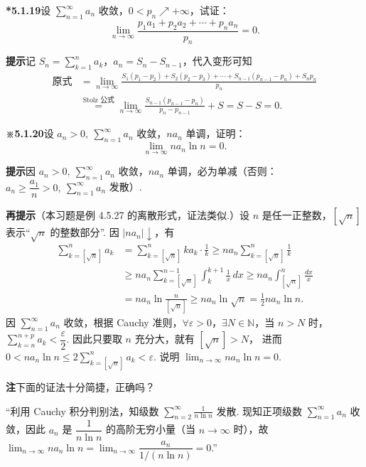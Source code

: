\documentclass[UTF8,12pt,a4paper,fontset=fandol]{ctexart}
\begin{document}
\noindent\textbf{*5.1.19}\quad 设 $\displaystyle\sum_{n=1}^{\infty}a_n$ 收敛，$0<p_n\nearrow+\infty$，试证：
\[
  \lim_{n\to\infty}\frac{p_1a_1+p_2a_2+\cdots+p_na_n}{p_n}=0.
\]

\noindent\textbf{提示}\quad 记 $S_n=\displaystyle\sum_{k=1}^n a_k$，$a_n=S_n-S_{n-1}$，代入变形可知
\[
\begin{aligned}
\text{原式}
&=\lim_{n\to\infty}
\frac{S_1(p_1-p_2)+S_2(p_2-p_3)+\cdots+S_{n-1}(p_{n-1}-p_n)+S_np_n}{p_n}\\
&\stackrel{\text{Stolz 公式}}{=}
\lim_{n\to\infty}\frac{S_{n-1}(p_{n-1}-p_n)}{p_n-p_{n-1}}+S
=S-S=0.
\end{aligned}
\]

\noindent\textbf{※5.1.20}\quad 设 $a_n>0,\ \displaystyle\sum_{n=1}^{\infty}a_n$ 收敛，$na_n$ 单调，证明：
\[
  \lim_{n\to\infty}na_n\ln n=0.
\]

\noindent\textbf{提示}\quad 因 $a_n>0,\ \sum_{n=1}^{\infty}a_n$ 收敛，$na_n$ 单调，必为单减（否则：
$a_n\ge\dfrac{a_1}{n}>0,\ \sum_{n=1}^{\infty}a_n$ 发散）.

\noindent\textbf{再提示}\quad （本习题是例 4.5.27 的离散形式，证法类似.）设 $n$ 是任一正整数，$[\sqrt n]$ 表示“$\sqrt n$ 的整数部分”. 因 $|na_n|\downarrow$，有
\[
\begin{aligned}
\sum_{k=[\sqrt n]}^n a_k
&=\sum_{k=[\sqrt n]}^n ka_k\cdot\frac1k
\ge na_n\sum_{k=[\sqrt n]}^n\frac1k\\
&\ge na_n\sum_{k=[\sqrt n]}^{n-1}\int_k^{k+1}\frac1x\,dx
\ge na_n\int_{[\sqrt n]}^n\frac{dx}{x}\\
&=na_n\ln\frac{n}{[\sqrt n]}
\ge na_n\ln\sqrt n=\frac12na_n\ln n.
\end{aligned}
\]
因 $\sum_{n=1}^{\infty}a_n$ 收敛，根据 Cauchy 准则，$\forall\varepsilon>0$，$\exists N\in\mathbb N$，当 $n>N$ 时，
$\displaystyle\sum_{k=n}^{n+p}a_k<\dfrac{\varepsilon}{2}$. 因此只要取 $n$ 充分大，就有 $[\sqrt n]>N$，
进而 $0<na_n\ln n\le2\displaystyle\sum_{k=[\sqrt n]}^na_k<\varepsilon$. 说明
$\lim_{n\to\infty}na_n\ln n=0$.

\noindent\textbf{注}\quad 下面的证法十分简捷，正确吗？

“利用 Cauchy 积分判别法，知级数
$\displaystyle\sum_{n=2}^{\infty}\frac1{n\ln n}$ 发散. 现知正项级数
$\displaystyle\sum_{n=1}^{\infty}a_n$ 收敛，因此 $a_n$ 是
$\dfrac1{n\ln n}$ 的高阶无穷小量（当 $n\to\infty$ 时），故
$\displaystyle\lim_{n\to\infty}na_n\ln n=\lim_{n\to\infty}\dfrac{a_n}{1/(n\ln n)}=0$.”
\end{document}
